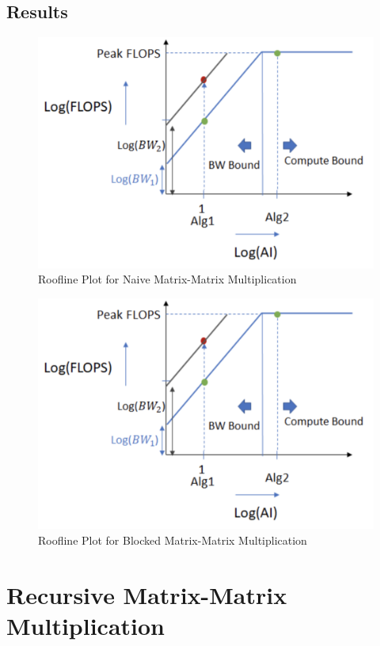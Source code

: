\documentclass{article}
\begin{document}
\subsection{Results}

\begin{figure}[!htb]
    \centering
    \includegraphics[width=0.8\linewidth]{roofline_plot.png}
    \caption{Roofline Plot for Naive Matrix-Matrix Multiplication}
\end{figure}

\begin{figure}[!htb]
    \centering
    \includegraphics[width=0.8\linewidth]{roofline_plot.png}
    \caption{Roofline Plot for Blocked Matrix-Matrix Multiplication}
\end{figure}


\section{Recursive Matrix-Matrix Multiplication}
\end{document}
